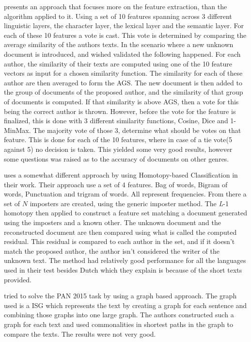 \cite{castro2015Paper} presents an approach that focuses more on the feature
extraction, than the algorithm applied to it. Using a set of 10 features
spanning across 3 different linguistic layers, the character layer, the lexical
layer and the semantic layer. For each of these 10 features a vote is cast. This
vote is determined by comparing the average similarity of the authors texts. In
the scenario where a new unknown document is introduced, and wished validated
the following happened. For each author, the similarity of their texts are
computed using one of the 10 feature vectors as input for a chosen similarity
function. The similarity for each of these author are then averaged to form
the \gls{AGS}. The new document is then added to the group of documents of the
proposed author, and the similarity of that group of documents is computed.
If that similarity is above \gls{AGS}, then a vote for this being the correct
author is thrown. However, before the vote for the feature is finalized, this
is done with 3 different similarity functions, Cosine, Dice and 1-MinMax. The
majority vote of those 3, determine what should be votes on that feature. This
is done for each of the 10 features, where in case of a tie vote(5 against 5) no
decision is taken. This yielded some very good results, however some questions
was raised as to the accuracy of documents on other genres.

\cite{gutierrez20150} uses a somewhat different approach by using Homotopy-based
Classification in their work. Their approach use a set of 4 features. Bag
of words, Bigram of words, Punctuation and trigram of words. All represent
frequencies. From there a set of $N$ imposters are created, using the generic
imposter method. The \textit{L}-1 homotopy then applied to construct a feature
set matching a document generated using the imposters and a known other. The
unknown document and the reconstructed document are then compared using what is
called the computed residual. This residual is compared to each author in the
set, and if it doesn't match the proposed author, the author isn't considered
the writer of the unknown text. The method had relatively good performance
for all the languages used in their test besides Dutch which they explain is
because of the short texts provided.

\cite{gomezadorno2015} tried to solve the PAN 2015 task by using a graph based
approach. The graph used is a \gls{ISG} which represents the text by creating a
graph for each sentence and combining those graphs into one large graph. The
authors constructed such a graph for each text and used commonalities in
shortest paths in the graph to compare the texts. The results were not very
good.

